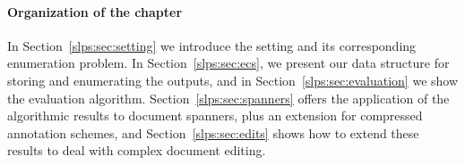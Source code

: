 \paragraph{Organization of the chapter} 
In Section~\ref{slps:sec:setting} we introduce the setting and its corresponding enumeration problem. 
In Section~\ref{slps:sec:ecs}, we present our data structure for storing and enumerating the outputs, and in Section~\ref{slps:sec:evaluation} we show the evaluation algorithm. 
Section~\ref{slps:sec:spanners} offers the application of the algorithmic results to document spanners, plus an extension for compressed annotation schemes, and Section~\ref{slps:sec:edits} shows how to extend these results to deal with complex document editing. 
